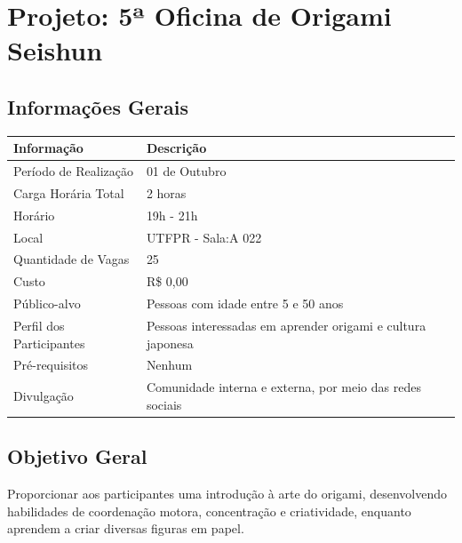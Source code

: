 \documentclass[12pt,a4paper]{article}
\begin{document}
\section*{Projeto: 5ª Oficina de Origami Seishun}

\subsection*{Informações Gerais}

\begin{table}[H]
\centering
\begin{tabularx}{\textwidth}{|>{\raggedright\arraybackslash}p{5cm}|X|}
\hline
\textbf{Informação} & \textbf{Descrição} \\ \hline

Período de Realização &
01 de Outubro \\ \hline

Carga Horária Total &
2 horas \\ \hline

Horário &
19h - 21h \\ \hline

Local &
UTFPR - Sala:A 022 \\ \hline

Quantidade de Vagas &
25 \\ \hline

Custo &
R\$ 0,00 \\ \hline

Público-alvo &
Pessoas com idade entre 5 e 50 anos \\ \hline

Perfil dos Participantes &
Pessoas interessadas em aprender origami e cultura japonesa \\ \hline

Pré-requisitos &
Nenhum \\ \hline

Divulgação &
Comunidade interna e externa, por meio das redes sociais \\ \hline

\end{tabularx}
\end{table}

\subsection*{Objetivo Geral}

Proporcionar aos participantes uma introdução à arte do origami, desenvolvendo
habilidades de coordenação motora, concentração e criatividade, enquanto
aprendem a criar diversas figuras em papel.
\end{document}
